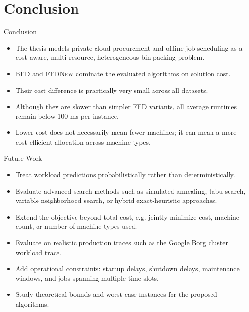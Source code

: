 \documentclass[aspectratio=169,10pt]{beamer}
\newcommand{\alg}[1]{\textsc{#1}}
\begin{document}
\section{Conclusion}

\begin{frame}{Conclusion}
  \begin{itemize}
    \item The thesis models private-cloud procurement and offline job scheduling as a cost-aware, multi-resource, heterogeneous bin-packing problem.
    \item \alg{BFD} and \alg{FFDNew} dominate the evaluated algorithms on solution cost.
    \item Their cost difference is practically very small across all datasets.
    \item Although they are slower than simpler FFD variants, all average runtimes remain below 100 ms per instance.
    \item Lower cost does not necessarily mean fewer machines; it can mean a more cost-efficient allocation across machine types.
  \end{itemize}
\end{frame}

\begin{frame}{Future Work}
  \begin{itemize}
    \item Treat workload predictions probabilistically rather than deterministically.
    \item Evaluate advanced search methods such as simulated annealing, tabu search, variable neighborhood search, or hybrid exact-heuristic approaches.
    \item Extend the objective beyond total cost, e.g. jointly minimize cost, machine count, or number of machine types used.
    \item Evaluate on realistic production traces such as the Google Borg cluster workload trace.
    \item Add operational constraints: startup delays, shutdown delays, maintenance windows, and jobs spanning multiple time slots.
    \item Study theoretical bounds and worst-case instances for the proposed algorithms.
  \end{itemize}
\end{frame}
\end{document}
